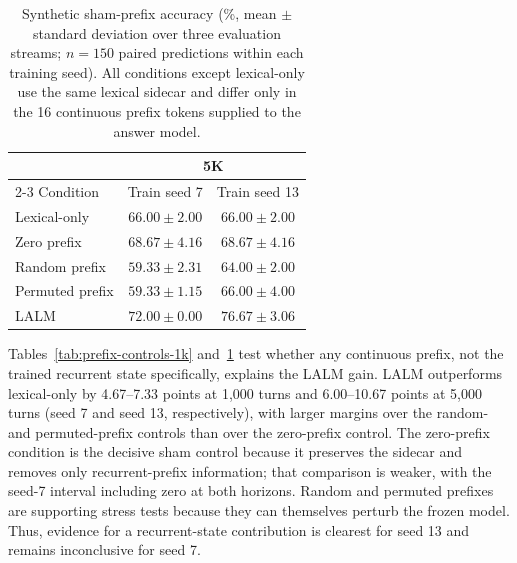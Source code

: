 \documentclass[conference]{IEEEtran}
\begin{document}
\begin{table}[t]
\centering
\small
\caption{Synthetic sham-prefix accuracy (\%, mean $\pm$ standard deviation
over three evaluation streams; $n=150$ paired predictions within each training
seed). All conditions except lexical-only use the same lexical sidecar and
differ only in the 16 continuous prefix tokens supplied to the answer model.}
\label{tab:prefix-controls-5k}
\begin{tabular}{lcc}
\toprule
& \multicolumn{2}{c}{5K} \\
\cmidrule(lr){2-3}
Condition & Train seed 7 & Train seed 13 \\
\midrule
Lexical-only    & $66.00\!\pm\!2.00$ & $66.00\!\pm\!2.00$ \\
Zero prefix     & $68.67\!\pm\!4.16$ & $68.67\!\pm\!4.16$ \\
Random prefix   & $59.33\!\pm\!2.31$ & $64.00\!\pm\!2.00$ \\
Permuted prefix & $59.33\!\pm\!1.15$ & $66.00\!\pm\!4.00$ \\
LALM            & $\mathbf{72.00}\!\pm\!0.00$ & $\mathbf{76.67}\!\pm\!3.06$ \\
\bottomrule
\end{tabular}
\end{table}

Tables~\ref{tab:prefix-controls-1k} and~\ref{tab:prefix-controls-5k} test whether any continuous prefix, not the trained recurrent state specifically, explains the LALM gain. LALM outperforms lexical-only by 4.67--7.33 points at 1,000 turns and 6.00--10.67 points at 5,000 turns (seed 7 and seed 13, respectively), with larger margins over the random- and permuted-prefix controls than over the zero-prefix control. The zero-prefix condition is the decisive sham control because it preserves the sidecar and removes only recurrent-prefix information; that comparison is weaker, with the seed-7 interval including zero at both horizons. Random and permuted prefixes are supporting stress tests because they can themselves perturb the frozen model. Thus, evidence for a recurrent-state contribution is clearest for seed 13 and remains inconclusive for seed 7.
\end{document}
